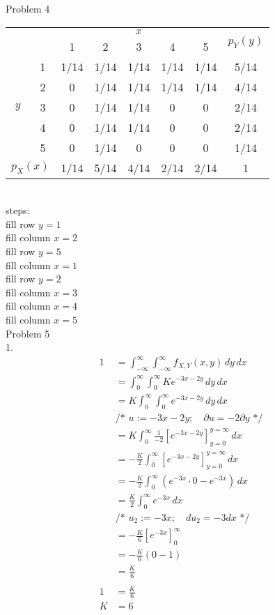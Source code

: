 \documentclass[12pt,border=4pt,multi]{article} %
\begin{document}
\newpage
\noindent
Problem 4
{\large
\begin{table}[!ht]
    \centering
        \begin{tabular}{|c|c|c|c|c|c|c|c|} \cline{3-8}
            \multicolumn{2}{c}{} & \multicolumn{5}{|c|}{$x$} & \multicolumn{1}{c|}{\multirow{2}{*}{$p_Y(y)$}}\\ \cline{3-7}
            \multicolumn{2}{c|}{} & 1 & 2 & 3 & 4 & 5 &\\ \hline
            \multirow{5}{*}{$y$} & 1 & 1/14 & 1/14 & 1/14 & 1/14 & 1/14 & 5/14\\ \cline{2-8}
             & 2 & 0 & 1/14 & 1/14 & 1/14 & 1/14 & 4/14\\ \cline{2-8}
             & 3 & 0 & 1/14 & 1/14 & 0 & 0 & 2/14\\ \cline{2-8}
             & 4 & 0 & 1/14 & 1/14 & 0 & 0 & 2/14\\ \cline{2-8}
             & 5 & 0 & 1/14 & 0 & 0 & 0 & 1/14\\ \hline
             \multicolumn{2}{|c|}{$p_X(x)$} & 1/14 & 5/14 & 4/14 & 2/14 & 2/14 & 1\\ \hline
        \end{tabular}
\end{table}
}\\
steps:\\
fill row $y = 1$\\
fill column $x = 2$\\
fill row $y = 5$\\
fill column $x = 1$\\
fill row $y = 2$\\
fill column $x = 3$\\
fill column $x = 4$\\
fill column $x = 5$\\
\newpage
\noindent
Problem 5\\
1.
\begin{align*}
 1 &= \int_{-\infty}^{\infty} \int_{-\infty}^{\infty} f_{X, Y}(x, y)\,dy\,dx\\
&= \int_{0}^{\infty} \int_{0}^{\infty} Ke^{-3x - 2y}\,dy\,dx\\
&= K\int_{0}^{\infty} \int_{0}^{\infty} e^{-3x - 2y}\,dy\,dx\\
&\text{/* } u := -3x - 2y;\quad \partial u = -2 \partial y \text{ */}\\
&= K\int_{0}^{\infty} \frac{1}{-2} \left[e^{-3x - 2y}\right]_{y = 0}^{y = \infty}\,dx\\
&= -\frac{K}{2}\int_{0}^{\infty} \left[e^{-3x - 2y}\right]_{y = 0}^{y = \infty}\,dx\\
&= -\frac{K}{2}\int_{0}^{\infty} (e^{-3x} \cdot 0 - e^{-3x})\,dx\\
&= \frac{K}{2}\int_{0}^{\infty} e^{-3x}\,dx\\
&\text{/* } u_2 := -3x;\quad du_2 = -3dx \text{ */}\\
&= - \frac{K}{6} [e^{-3x}]_0^{\infty}\\
&= - \frac{K}{6} (0  - 1)\\
&= \frac{K}{6}\\
\\
1 &= \frac{K}{6}\\
K &= \boxed{6}\\
\end{align*}
\end{document}
